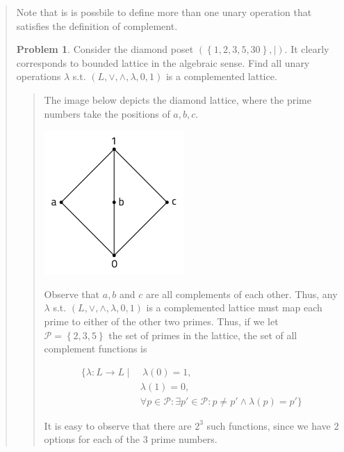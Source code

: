 \documentclass[a4paper, 12pt]{article}
\theoremstyle{definition}
\newtheorem{problem}{Problem}
\theoremstyle{definition}
\theoremstyle{definition}
\begin{document}
\begin{quote}
Note that is is possbile to define more than one unary operation that satisfies
the definition of complement.

\begin{problem}
    Consider the diamond poset $\left( \left\{ 1, 2, 3, 5, 30 \right\}, \mid
    \right) $. It clearly corresponds to bounded lattice in the algebraic
    sense. Find all unary operations $\lambda$ s.t. $(L, \lor, \land, \lambda,
    0, 1)$ is a complemented lattice.
\end{problem}


\small
\begin{quote}

    The image below depicts the diamond lattice, where the prime numbers 
    take the positions of $a, b, c$.

    \begin{center}
        \includegraphics[scale=0.5]{diamond}
    \end{center}

    Observe that $a, b$  and $c$ are all complements of each other. Thus, any
    $\lambda$ s.t. $(L, \lor, \land, \lambda, 0, 1)$ is a complemented lattice
    must map each prime to either of the other two primes. Thus, 
    if we let $\mathcal{P} = \left\{ 2, 3, 5 \right\} $ the set of 
    primes in the lattice, the set of all complement functions is

    \begin{align*}
        \{ \lambda : L \to L \mid &~\lambda(0) = 1, \\ 
                                       &\lambda(1) = 0, \\ 
                                       &\forall p \in \mathcal{P} : \exists p' \in \mathcal{P} : p \neq p' \land  \lambda(p) = p' \}
    \end{align*}

    It is easy to observe that there are $2^3$ such functions, since we have
    $2$ options for each of the $3$ prime numbers.



\end{quote}
\end{quote}
\end{document}
